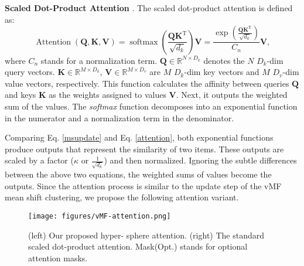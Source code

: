 \documentclass[letterpaper, 10 pt, conference]{ieeeconf}
\begin{document}
\textbf{Scaled Dot-Product Attention} \cite{vaswani2017attention}. The scaled dot-product attention is defined as:
\vspace{-4mm}
\begin{equation} \label{attention}
\operatorname{Attention}(\mathbf{Q}, \mathbf{K}, \mathbf{V})  = \operatorname{softmax}\left(\frac{\mathbf{Q} \mathbf{K}^\mathrm{T}}{\sqrt{d_k}}\right) \mathbf{V}    = \frac{\exp{\left(\frac{\mathbf{Q} \mathbf{K}^\mathrm{T}}{\sqrt{d_k}}\right)}}{C_n} \mathbf{V},
\end{equation}
where $C_n$ stands for a normalization term. $\mathbf{Q} \in \mathbb{R}^{N \times D_k}$ denotes the $N$ $D_k$-dim query vectors. $\mathbf{K} \in \mathbb{R}^{M \times D_k}$, $\mathbf{V} \in \mathbb{R}^{M \times D_v}$ are $M$ $D_k$-dim key vectors and $M$ $D_v$-dim value vectors, respectively. This function calculates the affinity between queries $\mathbf{Q}$ and keys $\mathbf{K}$ as the weights assigned to values $\mathbf{V}$. Next, it outputs the weighted sum of the values. The \textit{softmax} function decomposes into an exponential function in the numerator and a normalization term in the denominator. 

Comparing Eq. \eqref{msupdate} and Eq. \eqref{attention}, both exponential functions produce outputs that represent the similarity of two items. These outputs are scaled by a factor ($\kappa$ or $\frac{1}{\sqrt{d_k}}$) and then normalized. Ignoring the subtle differences between the above two equations, the weighted sums of values become the outputs. Since the attention process is similar to the update step of the vMF mean shift clustering, we propose the following attention variant.



\begin{figure}
    \centering
\texttt{[image: figures/vMF-attention.png]}
    \vspace{-4mm}
    \caption{ (left) Our proposed hyper-
sphere attention. (right) The standard
scaled dot-product attention. Mask(Opt.) stands for optional attention masks.}
    \label{fig:attention}
    \vspace{-6mm}
\end{figure}
\end{document}
